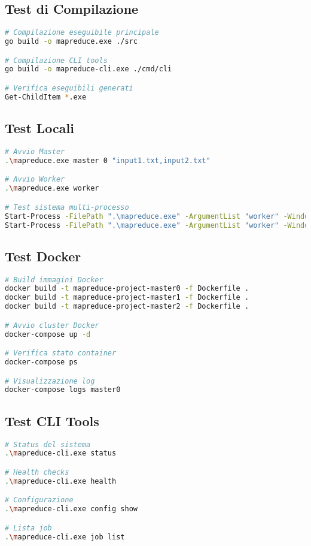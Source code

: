 \documentclass[12pt,a4paper]{article}
\begin{document}
\subsection{Test di Compilazione}

\begin{lstlisting}[language=bash]
# Compilazione eseguibile principale
go build -o mapreduce.exe ./src

# Compilazione CLI tools
go build -o mapreduce-cli.exe ./cmd/cli

# Verifica eseguibili generati
Get-ChildItem *.exe
\end{lstlisting}

\subsection{Test Locali}

\begin{lstlisting}[language=bash]
# Avvio Master
.\mapreduce.exe master 0 "input1.txt,input2.txt"

# Avvio Worker
.\mapreduce.exe worker

# Test sistema multi-processo
Start-Process -FilePath ".\mapreduce.exe" -ArgumentList "worker" -WindowStyle Hidden
Start-Process -FilePath ".\mapreduce.exe" -ArgumentList "worker" -WindowStyle Hidden
\end{lstlisting}

\subsection{Test Docker}

\begin{lstlisting}[language=bash]
# Build immagini Docker
docker build -t mapreduce-project-master0 -f Dockerfile .
docker build -t mapreduce-project-master1 -f Dockerfile .
docker build -t mapreduce-project-master2 -f Dockerfile .

# Avvio cluster Docker
docker-compose up -d

# Verifica stato container
docker-compose ps

# Visualizzazione log
docker-compose logs master0
\end{lstlisting}

\subsection{Test CLI Tools}

\begin{lstlisting}[language=bash]
# Status del sistema
.\mapreduce-cli.exe status

# Health checks
.\mapreduce-cli.exe health

# Configurazione
.\mapreduce-cli.exe config show

# Lista job
.\mapreduce-cli.exe job list
\end{lstlisting}
\end{document}
